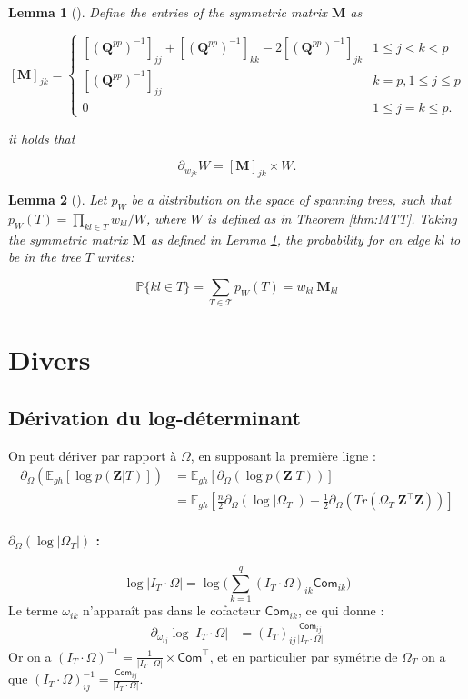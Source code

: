 \documentclass[11pt,a4paper]{article}
\newtheorem{lemma}{Lemma}
\newcommand{\Zbf}{\boldsymbol{Z}}
\newcommand{\Qbf}{\boldsymbol{Q}}
\newcommand{\Mbf}{\boldsymbol{M}}
\newcommand{\Esp}{\mathds{E}}
\begin{document}
\begin{lemma} [\cite{Meila}] \label{lem:Meila}
    Define the entries of the symmetric matrix $\Mbf$ as
 
\[    
 [\Mbf]_{jk} =\begin{cases}
    \left[(\Qbf^{pp})^{-1}\right]_{jj} + \left[(\Qbf^{pp})^{-1}\right]_{kk} -2\left[(\Qbf^{pp})^{-1}\right]_{jk} & 1\leq j<k < p\\
    \left[(\Qbf^{pp})^{-1}\right]_{jj} & k=p, 1\leq j \leq p  \\
    0 & 1\leq j=k \leq p.
    \end{cases}
\]
 
it holds that
 
$$
\partial_{w_{jk}} W = [\Mbf]_{jk}  \times W.
$$
\end{lemma}
\begin{lemma} [\cite{kirshner}] \label{lem:Kirshner}
    Let $p_W$ be a distribution on the space of spanning trees, such that $p_W(T)=\prod_{kl\in T} w_{kl} / W$, where $W$ is defined as in Theorem \ref{thm:MTT}. Taking the symmetric matrix $\Mbf$ as defined in Lemma  \ref{lem:Meila}, the probability for an edge $kl$ to be in the tree $T$ writes:
 
$$\mathds{P}\{kl\in T\} = \sum_{T\in \mathcal{T}} p_W(T)= w_{kl}\: \Mbf_{kl}$$
\end{lemma}
 \section{Divers}
 
\subsection{Dérivation du log-déterminant}
On peut dériver par rapport à $\Omega$, en supposant la première ligne :
\begin{align}
    \partial_{\Omega}\left(\Esp_{gh}\left[\log p(\Zbf | T)\right] \right)&=  \Esp_{gh}\left[\partial_{\Omega}( \log p(\Zbf | T) )\right] \\
    &=\Esp_{gh}\left[\frac{n}{2}\partial_{\Omega}( \log |\Omega_T|) -\frac{1}{2} \partial_\Omega (Tr(\Omega_T \; \Zbf^\intercal \Zbf ))\right]
\end{align}

\paragraph{\underline{$\partial_{\Omega}( \log |\Omega_T|)$} :}
 $$\log |I_T \cdot \Omega| = \log \big(\sum_{k=1}^q (I_T\cdot \Omega)_{ik} \mathsf{Com}_{ik}\big)$$
Le terme $\omega_{ik}$ n'apparaît pas dans le cofacteur $\mathsf{Com}_{ik}$, ce qui donne :
\begin{align*}
    \partial_{\omega_{ij}} \log |I_T\cdot \Omega| &= (I_T)_{ij} \frac{\mathsf{Com}_{ij}}{|I_T\cdot \Omega |}
\end{align*}
Or on a $(I_T\cdot \Omega)^{-1} = \frac{1}{|I_T \cdot \Omega|}\times \mathsf{Com}^\intercal$, et en particulier par symétrie de $\Omega_T$ on a que $(I_T\cdot \Omega)_{ij}^{-1}=\frac{\mathsf{Com}_{ij}}{|I_T\cdot \Omega |}$.
\end{document}
